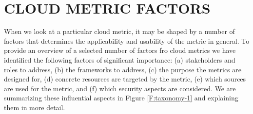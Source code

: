 \documentclass{sig-alternate-05-2015}
\begin{document}
\section{CLOUD METRIC FACTORS} \label {S:factors}

When we look at a particular cloud metric, it may be shaped by a number of factors that determines the applicability and usability of the metric in general. To provide an overview of a selected number of factors fro cloud metrics we have identified the following factors of significant importance: (a) stakeholders and roles to address, (b) the frameworks to address, (c) the purpose the metrics are designed for, (d) concrete resources are targeted by the metric, (e) which sources are used for the metric, and (f) which security aspects are considered. We are summarizing these influential aspects in Figure \ref{F:taxonomy-1} and explaining them in more detail.
\end{document}
